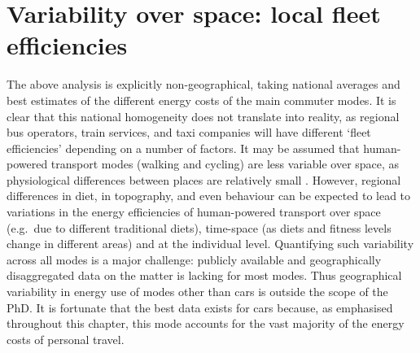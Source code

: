 \section{Variability over space: local fleet efficiencies}
\label{seffspace}
The above analysis is explicitly
non-geographical, taking national averages and best estimates of the different
energy costs of the main commuter modes. It is clear that this national
homogeneity does not translate into reality, as regional bus operators,
train services, and taxi companies will have different `fleet efficiencies'
depending on a number of factors. It may be assumed that human-powered transport
modes (walking and cycling) are less variable over space, as physiological
differences between places are relatively small \citep{hayter1992variability,
Shetty2007}. However, regional differences in
diet, in topography, and even behaviour can be expected to lead to
variations in the energy efficiencies of human-powered transport over space
(e.g.~due to different traditional diets), time-space (as diets and fitness
levels change in different areas) and at the individual level. Quantifying
such variability across all modes is a major challenge: publicly
available and geographically disaggregated data on the matter is lacking for
most modes. Thus geographical variability in energy use of modes other
than cars is outside the scope of the PhD. It is fortunate that the best data
exists for cars because, as emphasised throughout this chapter, this mode
accounts for
the vast majority of the energy costs of personal travel. 


